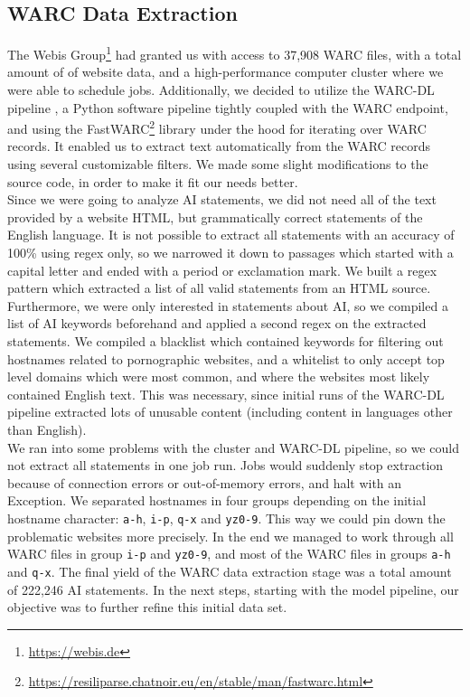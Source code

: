 \subsection{WARC Data Extraction}
The Webis Group\footnote{\url{https://webis.de}} had granted us with access to 37,908 WARC files, with a total amount of  of website data, and a high-performance computer cluster where we were able to schedule jobs.
Additionally, we decided to utilize the WARC-DL pipeline \citep{Deckers2022}, a Python software pipeline tightly coupled with the WARC endpoint, and using the FastWARC\footnote{\url{https://resiliparse.chatnoir.eu/en/stable/man/fastwarc.html}} library under the hood for iterating over WARC records.
It enabled us to extract text automatically from the WARC records using several customizable filters.
We made some slight modifications to the source code, in order to make it fit our needs better.
\\
Since we were going to analyze AI statements, we did not need all of the text provided by a website HTML, but grammatically correct statements of the English language.
It is not possible to extract all statements with an accuracy of 100\% using regex only, so we narrowed it down to passages which started with a capital letter and ended with a period or exclamation mark.
We built a regex pattern which extracted a list of all valid statements from an HTML source.
\\
Furthermore, we were only interested in statements about AI, so we compiled a list of AI keywords beforehand and applied a second regex on the extracted statements.
We compiled a blacklist which contained keywords for filtering out hostnames related to pornographic websites, and a whitelist to only accept top level domains which were most common, and where the websites most likely contained English text.
This was necessary, since initial runs of the WARC-DL pipeline extracted lots of unusable content (including content in languages other than English).
\\
We ran into some problems with the cluster and WARC-DL pipeline, so we could not extract all statements in one job run.
Jobs would suddenly stop extraction because of connection errors or out-of-memory errors, and halt with an Exception.
We separated hostnames in four groups depending on the initial hostname character: \texttt{a-h}, \texttt{i-p}, \texttt{q-x} and \texttt{yz0-9}.
This way we could pin down the problematic websites more precisely.
In the end we managed to work through all WARC files in group \texttt{i-p} and \texttt{yz0-9}, and most of the WARC files in groups \texttt{a-h} and \texttt{q-x}.
The final yield of the WARC data extraction stage was a total amount of 222,246 AI statements.
In the next steps, starting with the model pipeline, our objective was to further refine this initial data set.


